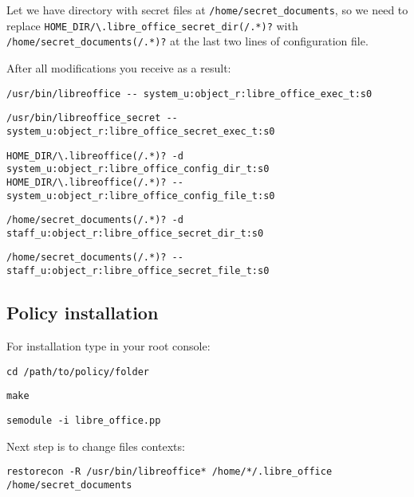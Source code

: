 Let we have directory with secret files at
\texttt{/home/secret\_documents}, so we need to replace
\texttt{HOME\_DIR/\textbackslash{}.libre\_office\_secret\_dir(/.*)?}
with \texttt{/home/secret\_documents(/.*)?} at the last two lines of
configuration file.

After all modifications you receive as a result:

\texttt{/usr/bin/libreoffice -{}- system\_u:object\_r:libre\_office\_exec\_t:s0}

\texttt{/usr/bin/libreoffice\_secret -{}- system\_u:object\_r:libre\_office\_secret\_exec\_t:s0}

\texttt{HOME\_DIR/\textbackslash{}.libreoffice(/.*)? -d system\_u:object\_r:libre\_office\_config\_dir\_t:s0 HOME\_DIR/\textbackslash{}.libreoffice(/.*)? -{}- system\_u:object\_r:libre\_office\_config\_file\_t:s0}

\texttt{/home/secret\_documents(/.*)? -d staff\_u:object\_r:libre\_office\_secret\_dir\_t:s0}

\texttt{/home/secret\_documents(/.*)? -{}- staff\_u:object\_r:libre\_office\_secret\_file\_t:s0}

\subsection{Policy installation}

For installation type in your root console:

\texttt{cd /path/to/policy/folder}

\texttt{make}

\texttt{semodule -i libre\_office.pp}

Next step is to change files contexts:

\texttt{restorecon -R /usr/bin/libreoffice* /home/*/.libre\_office /home/secret\_documents}

